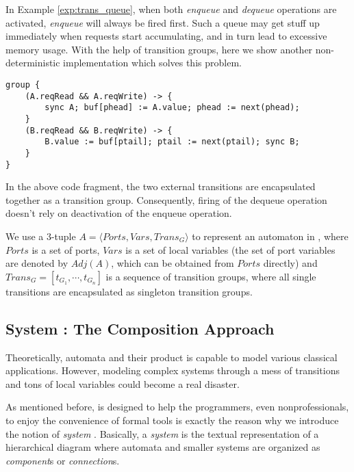 \begin{example} In Example \ref{exp:trans_queue}, when both \emph{enqueue} and \emph{dequeue} operations are activated, \emph{enqueue} will always be fired first. Such a queue may get stuff up immediately when requests start accumulating, and in turn lead to excessive memory usage. With the help of transition groups, here we show another non-deterministic implementation which solves this problem.
\begin{lstlisting}
group {
    (A.reqRead && A.reqWrite) -> {
        sync A; buf[phead] := A.value; phead := next(phead);
    }
    (B.reqRead && B.reqWrite) -> {
        B.value := buf[ptail]; ptail := next(ptail); sync B;
    }
}
\end{lstlisting}
In the above code fragment, the two external transitions are encapsulated together as a transition group. Consequently, firing of the dequeue operation doesn't rely on deactivation of the enqueue operation.
\label{exp:transgroup_queue}
\end{example}


We use a 3-tuple $A=\langle Ports, Vars, Trans_G \rangle$ to represent an automaton in \lang{}, where $Ports$ is a set of ports, $Vars$ is a set of local variables (the set of port variables are denoted by $Adj(A)$, which can be obtained from $Ports$ directly) and $Trans_G=[t_{G_1},\cdots,t_{G_n}]$ is a sequence of transition groups, where all single transitions are encapsulated as singleton transition groups.

\subsection{System : The Composition Approach}
\label{subsec:system}

Theoretically, automata and their product is capable to model various classical applications. However, modeling complex systems through a mess of transitions and tons of local variables could become a real disaster.

As mentioned before, \lang{} is designed to help the programmers, even nonprofessionals, to enjoy the convenience of formal tools is exactly the reason why we introduce the notion of \emph{system} . Basically, a \emph{system} is the textual representation of a hierarchical diagram where automata and smaller systems are organized as \emph{component}s or 
\emph{connection}s. 


